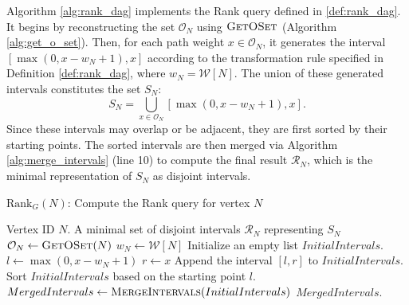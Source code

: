 
Algorithm \ref{alg:rank_dag} implements the Rank query defined in \ref{def:rank_dag}. It begins by reconstructing the set $\mathcal{O}_N$ using $\textsc{GetOSet}$ (Algorithm \ref{alg:get_o_set}). Then, for each path weight $x \in \mathcal{O}_N$, it generates the interval $[\max(0, x - w_N + 1), x]$ according to the transformation rule specified in Definition \ref{def:rank_dag}, where $w_N = \mathcal{W}[N]$. The union of these generated intervals constitutes the set $S_N$:
\[ S_N = \bigcup_{x \in \mathcal{O}_N} [ \max(0, x - w_N + 1), x ]. \]
Since these intervals may overlap or be adjacent, they are first sorted by their starting points. The sorted intervals are then merged via Algorithm \ref{alg:merge_intervals} (line 10) to compute the final result $\mathcal{R}_N$, which is the minimal representation of $S_N$ as disjoint intervals.

\begin{algorithm}
    \caption{$\mathrm{Rank}_G(N)$: Compute the Rank query for vertex $N$}
    \label{alg:rank_dag}
    \small
    \begin{algorithmic}[1]
        \Require Vertex ID $N$.
        \Ensure A minimal set of disjoint intervals $\mathcal{R}_N$ representing $S_N$
        \State $\mathcal{O}_N \gets \textsc{GetOSet}(N)$
        \State $w_N \gets \mathcal{W}[N]$
        \State Initialize an empty list $InitialIntervals$.
        \State $l \gets \max(0, x - w_N + 1)$
        \State $r \gets x$
        \State Append the interval $[l, r]$ to $InitialIntervals$.
        \EndFor
        \State Sort $InitialIntervals$ based on the starting point $l$.
        \State $MergedIntervals \gets \textsc{MergeIntervals}(InitialIntervals)$
        \State \Return $MergedIntervals$.
    \end{algorithmic}
\end{algorithm}


